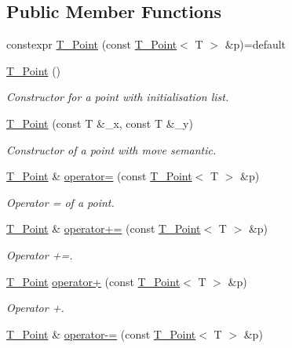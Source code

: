 \subsection*{Public Member Functions}
\begin{DoxyCompactItemize}
\item 
constexpr \hyperlink{classT__Point_af313da04154273b9a75d66e9950359ea}{T\+\_\+\+Point} (const \hyperlink{classT__Point}{T\+\_\+\+Point}$<$ T $>$ \&p)=default
\item 
\hyperlink{classT__Point_a61017b12d3c2aa88a242dbbc57733413}{T\+\_\+\+Point} ()
\begin{DoxyCompactList}\small\item\em Constructor for a point with initialisation list. \end{DoxyCompactList}\item 
\hyperlink{classT__Point_a12f2ef3c5f10e162dcb6385bbfbfae58}{T\+\_\+\+Point} (const T \&\+\_\+x, const T \&\+\_\+y)
\begin{DoxyCompactList}\small\item\em Constructor of a point with move semantic. \end{DoxyCompactList}\item 
\hyperlink{classT__Point}{T\+\_\+\+Point} \& \hyperlink{classT__Point_a13fbb5646f2333aa41194d648423e10f}{operator=} (const \hyperlink{classT__Point}{T\+\_\+\+Point}$<$ T $>$ \&p)
\begin{DoxyCompactList}\small\item\em Operator = of a point. \end{DoxyCompactList}\item 
\hyperlink{classT__Point}{T\+\_\+\+Point} \& \hyperlink{classT__Point_a4fa7b8ceb837c81e608d5ddad0f1ffe7}{operator+=} (const \hyperlink{classT__Point}{T\+\_\+\+Point}$<$ T $>$ \&p)
\begin{DoxyCompactList}\small\item\em Operator +=. \end{DoxyCompactList}\item 
\hyperlink{classT__Point}{T\+\_\+\+Point} \hyperlink{classT__Point_a1f94a7a19cc8711e7784f700ea59297a}{operator+} (const \hyperlink{classT__Point}{T\+\_\+\+Point}$<$ T $>$ \&p)
\begin{DoxyCompactList}\small\item\em Operator +. \end{DoxyCompactList}\item 
\hyperlink{classT__Point}{T\+\_\+\+Point} \& \hyperlink{classT__Point_aa438de3090999e1f24f0de58dc5171a0}{operator-\/=} (const \hyperlink{classT__Point}{T\+\_\+\+Point}$<$ T $>$ \&p)

\end{DoxyCompactItemize}
